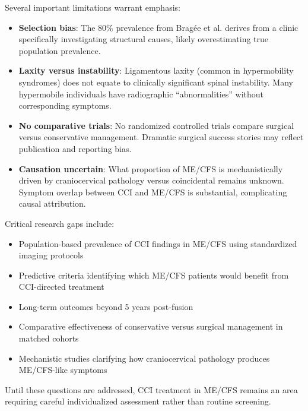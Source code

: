 \begin{warning}
\label{warn:cci-caveats}
Several important limitations warrant emphasis:
\begin{itemize}
    \item \textbf{Selection bias}: The 80\% prevalence from Bragée et al. derives from a clinic specifically investigating structural causes, likely overestimating true population prevalence.
    \item \textbf{Laxity versus instability}: Ligamentous laxity (common in hypermobility syndromes) does not equate to clinically significant spinal instability. Many hypermobile individuals have radiographic ``abnormalities'' without corresponding symptoms.
    \item \textbf{No comparative trials}: No randomized controlled trials compare surgical versus conservative management. Dramatic surgical success stories may reflect publication and reporting bias.
    \item \textbf{Causation uncertain}: What proportion of ME/CFS is mechanistically driven by craniocervical pathology versus coincidental remains unknown. Symptom overlap between CCI and ME/CFS is substantial, complicating causal attribution.
\end{itemize}
\end{warning}

\begin{open_question}
\label{oq:cci-research-gaps}
Critical research gaps include:
\begin{itemize}
    \item Population-based prevalence of CCI findings in ME/CFS using standardized imaging protocols
    \item Predictive criteria identifying which ME/CFS patients would benefit from CCI-directed treatment
    \item Long-term outcomes beyond 5 years post-fusion
    \item Comparative effectiveness of conservative versus surgical management in matched cohorts
    \item Mechanistic studies clarifying how craniocervical pathology produces ME/CFS-like symptoms
\end{itemize}
Until these questions are addressed, CCI treatment in ME/CFS remains an area requiring careful individualized assessment rather than routine screening.
\end{open_question}

